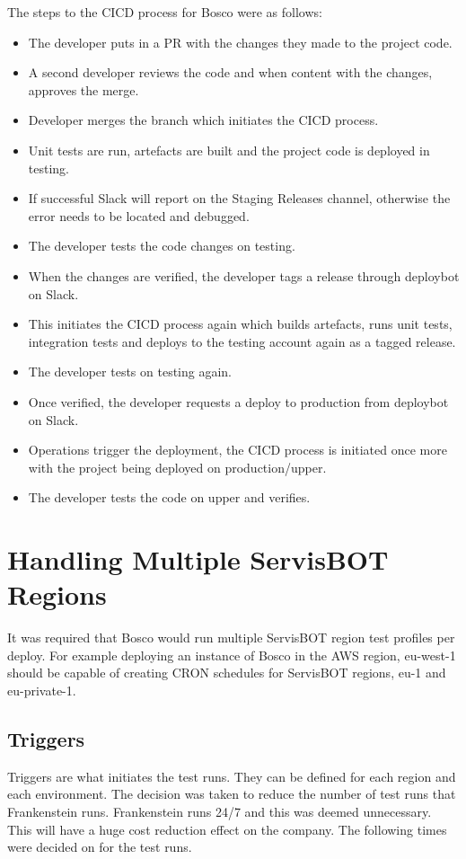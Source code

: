 \documentclass[12pt,a4paper,titlepage]{report}
\begin{document}
The steps to the CICD process for Bosco were as follows:

\begin{itemize}
  \item The developer puts in a \ac{PR} with the changes they made to the project code.
  \item A second developer reviews the code and when content with the changes, approves the merge.
  \item Developer merges the branch which initiates the CICD process. 
  \item Unit tests are run, artefacts are built and the project code is deployed in testing.
  \item If successful Slack will report on the Staging Releases channel, otherwise the error needs to be located and debugged. 
  \item The developer tests the code changes on testing.
  \item When the changes are verified, the developer tags a release through deploybot on Slack.
  \item This initiates the CICD process again which builds artefacts, runs unit tests, integration tests and deploys to the testing account again as a tagged release.
  \item The developer tests on testing again.
  \item Once verified, the developer requests a deploy to production from deploybot on Slack.
  \item Operations trigger the deployment, the CICD process is initiated once more with the project being deployed on production/upper.
  \item The developer tests the code on upper and verifies.
\end{itemize}

\section{Handling Multiple ServisBOT Regions}
It was required that Bosco would run multiple ServisBOT region test profiles per deploy. For example deploying an instance of 
Bosco in the AWS region, eu-west-1 should be capable of creating CRON schedules for ServisBOT regions, eu-1 and eu-private-1. 

\subsection{Triggers}
Triggers are what initiates the test runs. They can be defined for each region and each environment. The decision was taken 
to reduce the number of test runs that Frankenstein runs. Frankenstein runs 24/7 and this was deemed unnecessary. This will have a huge cost reduction 
effect on the company. The following times were decided on for the test runs.
\end{document}
